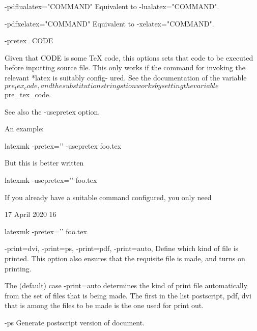        -pdflualatex="COMMAND"
              Equivalent to -lualatex="COMMAND".


       -pdfxelatex="COMMAND"
              Equivalent to -xelatex="COMMAND".


       -pretex=CODE

              Given that CODE is some TeX code, this options sets that code to
              be  executed  before  inputting source file.  This only works if
              the command for invoking the relevant *latex is suitably config-
              ured.   See the documentation of the variable $pre_tex_code, and
              the substitution strings %
              tion works by setting the variable $pre_tex_code.

              See also the -usepretex option.

              An example:

                  latexmk  -pretex=''  -usepretex
              foo.tex

              But this is better written

                  latexmk -usepretex='' foo.tex

              If you already have a suitable command configured, you only need




                                 17 April 2020                              16








                  latexmk -pretex='' foo.tex


       -print=dvi, -print=ps, -print=pdf, -print=auto,
              Define which kind of file is printed.  This option also  ensures
              that the requisite file is made, and turns on printing.

              The (default) case -print=auto determines the kind of print file
              automatically from the set of files that  is  being  made.   The
              first  in  the list postscript, pdf, dvi that is among the files
              to be made is the one used for print out.


       -ps    Generate postscript version of document.


